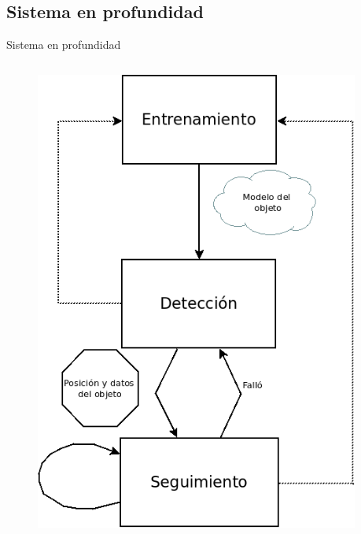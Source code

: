 \documentclass[]{beamer}
\begin{document}
\subsection{Sistema en profundidad}
\begin{frame}[fragile]{Sistema en profundidad}
    \begin{columns}
        \begin{column}{5cm}
            \begin{figure}
                \centering
                \vspace{-15pt}
                \includegraphics[scale=0.3]{img/esquema_seguimiento.png}
            \end{figure}
        \end{column}

        \begin{column}{0.5cm}
        \end{column}


\end{columns}
\end{frame}
\end{document}
